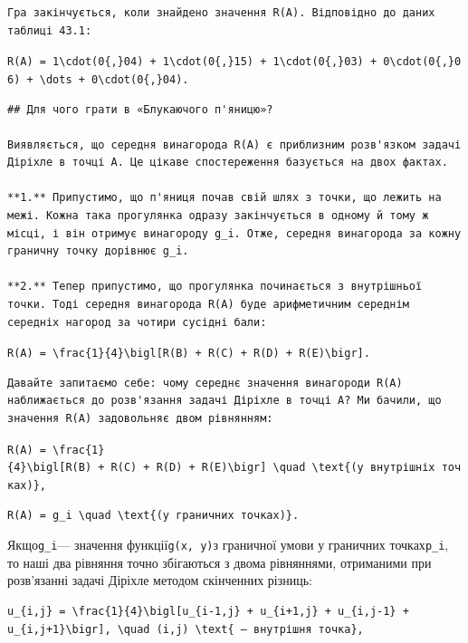 \documentclass[
  ukrainian,
]{article}
\begin{document}
\begin{verbatim}
Гра закінчується, коли знайдено значення R(A). Відповідно до даних таблиці 43.1:
\end{verbatim}

\texttt{R(A)\ =\ 1\textbackslash{}cdot(0\{,\}04)\ +\ 1\textbackslash{}cdot(0\{,\}15)\ +\ 1\textbackslash{}cdot(0\{,\}03)\ +\ 0\textbackslash{}cdot(0\{,\}06)\ +\ \textbackslash{}dots\ +\ 0\textbackslash{}cdot(0\{,\}04).}

\begin{verbatim}
## Для чого грати в «Блукаючого п'яницю»?

Виявляється, що середня винагорода R(A) є приблизним розв'язком задачі Діріхле в точці A. Це цікаве спостереження базується на двох фактах.

**1.** Припустимо, що п'яниця почав свій шлях з точки, що лежить на межі. Кожна така прогулянка одразу закінчується в одному й тому ж місці, і він отримує винагороду g_i. Отже, середня винагорода за кожну граничну точку дорівнює g_i.

**2.** Тепер припустимо, що прогулянка починається з внутрішньої точки. Тоді середня винагорода R(A) буде арифметичним середнім середніх нагород за чотири сусідні бали:
\end{verbatim}

\texttt{R(A)\ =\ \textbackslash{}frac\{1\}\{4\}\textbackslash{}bigl{[}R(B)\ +\ R(C)\ +\ R(D)\ +\ R(E)\textbackslash{}bigr{]}.}

\begin{verbatim}
Давайте запитаємо себе: чому середнє значення винагороди R(A) наближається до розв'язання задачі Діріхле в точці A? Ми бачили, що значення R(A) задовольняє двом рівнянням:
\end{verbatim}

\texttt{R(A)\ =\ \textbackslash{}frac\{1\}\{4\}\textbackslash{}bigl{[}R(B)\ +\ R(C)\ +\ R(D)\ +\ R(E)\textbackslash{}bigr{]}\ \textbackslash{}quad\ \textbackslash{}text\{(у\ внутрішніх\ точках)\},}

\begin{verbatim}
R(A) = g_i \quad \text{(у граничних точках)}.
\end{verbatim}

Якщо\texttt{g\_i}--- значення функції\texttt{g(x,\ y)}з граничної умови
у граничних точках\texttt{p\_i}, то наші два рівняння точно збігаються з
двома рівняннями, отриманими при розв'язанні задачі Діріхле методом
скінченних різниць:

\begin{verbatim}
u_{i,j} = \frac{1}{4}\bigl[u_{i-1,j} + u_{i+1,j} + u_{i,j-1} + u_{i,j+1}\bigr], \quad (i,j) \text{ — внутрішня точка},
\end{verbatim}
\end{document}

